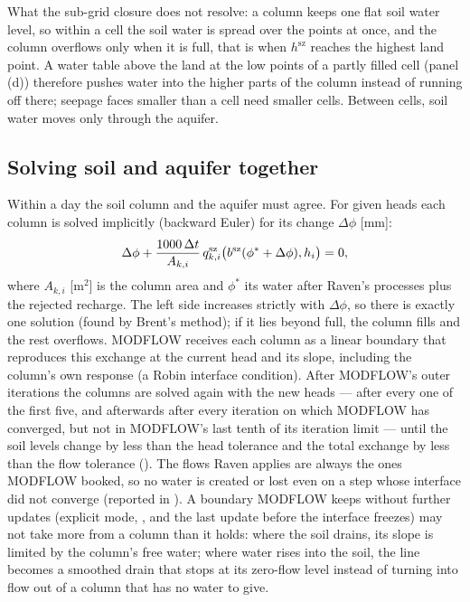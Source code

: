 What the sub-grid closure does not resolve: a column keeps one flat soil water level, so within a cell the soil water is
spread over the points at once, and the column overflows only when it is full, that is when $h^{\mathrm{sz}}$ reaches the highest
land point. A water table above the land at the low points of a partly filled cell (panel (d)) therefore pushes water into the higher parts of the column instead of running off there;
seepage faces smaller than a cell need smaller cells. Between cells, soil water moves only through the aquifer.

\subsection{Solving soil and aquifer together}
Within a day the soil column and the aquifer must agree. For given heads each column is solved implicitly
(backward Euler) for its change $\Delta\phi$ [mm]:
\begin{equation}
\Delta\phi+\frac{1000\,\Delta t}{A_{k,i}}\,q^{\mathrm{sz}}_{k,i}\big(b^{\mathrm{sz}}(\phi^*+\Delta\phi),h_i\big)=0,
\end{equation}
where $A_{k,i}$ [m$^2$] is the column area and $\phi^*$ its water after Raven's processes plus the rejected recharge. The left side
increases strictly with $\Delta\phi$, so there is exactly one solution (found by Brent's method); if it lies beyond full, the
column fills and the rest overflows. MODFLOW receives each column as a linear boundary that reproduces this exchange at
the current head and its slope, including the column's own response (a Robin interface condition). After MODFLOW's
outer iterations the columns are solved again with the new heads --- after every one of the first five, and afterwards
after every iteration on which MODFLOW has converged, but not in MODFLOW's last tenth of its iteration limit --- until
the soil levels change by less than the head tolerance and the total exchange by less than the flow tolerance
(). The flows Raven applies are always
the ones MODFLOW booked, so no water is created or lost even on a step whose interface did not converge (reported in
). A boundary MODFLOW keeps without further updates (explicit mode, ,
and the last update before the interface freezes) may not take more from a column than it holds: where the soil
drains, its slope is limited by the column's free water; where water rises into the soil, the line becomes a smoothed
drain that stops at its zero-flow level instead of turning into flow out of a column that has no water to give.

